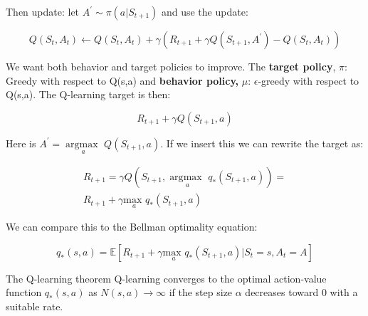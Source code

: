 Then update: let $A^{\prime} \sim \pi (a|S_{t+1})$ and use the update:

	\begin{equation}
		Q(S_t,A_t) \leftarrow Q(S_t,A_t) + \gamma(R_{t+1} + \gamma Q(S_{t+1},A^{\prime})-Q(S_t,A_t))
	\end{equation}

We want both behavior and target policies to improve. The \textbf{target policy}, $\pi$: Greedy with respect to Q(s,a) and \textbf{behavior policy, }$\mu$: $\epsilon$-greedy with respect to Q(s,a). The Q-learning target is then:

	\begin{equation}
 		R_{t+1} + \gamma Q(S_{t+1},a)
 	\end{equation}

Here is $A^{\prime} = \underset{a}{\arg \text{max }}Q(S_{t+1},a)$. If we insert this we can rewrite the target as:

	\begin{equation}
	\begin{aligned}
		R_{t+1} = \gamma Q(S_{t+1}, \underset{a}{\arg \text{max }} q_*(S_{t+1},a)) = \\
		R_{t+1} + \gamma \underset{a}{\text{max }}q_*(S_{t+1},a)
	\end{aligned}
	\end{equation}

We can compare this to the Bellman optimality equation:

	\begin{equation}
		q_*(s,a) = \mathbb{E}[R_{t+1} + \gamma \underset{a}{\text{max }}q_*(S_{t+1},a)|S_t=s,A_t =A]
	\end{equation}

\begin{wbox}{The Q-learning theorem}
Q-learning converges to the optimal action-value function $q_*(s,a)$ as $N(s,a) \rightarrow \infty$ if the step size $\alpha$ decreases toward 0 with a suitable rate.  
\end{wbox}



























